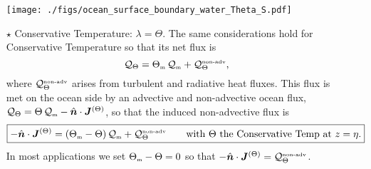 \documentclass[10pt]{beamer}
\begin{document}
\begin{frame}
\begin{itemize}
\begin{center}
{\texttt{[image: ./figs/ocean\_surface\_boundary\_water\_Theta\_S.pdf]}}
 \end{center}


\item[$\star$] {\sc Conservative Temperature}: $\lambda = \Theta$.
  The same considerations hold for Conservative Temperature so that
  its net flux is
\begin{equation*}  
\mathcal{Q}_{\Theta} = \Theta_{\mbox{\tiny m}} \,
  \mathcal{Q}_{\mbox{\tiny m}} + \mathcal{Q}_{\Theta}^{\mbox{\tiny non-adv}}, 
\end{equation*}
where $\mathcal{Q}_{\Theta}^{\mbox{\tiny non-adv}}$ arises from
turbulent and radiative heat fluxes.  This flux is met on the ocean
side by an advective and non-advective ocean flux,
$\mathcal{Q}_{\Theta} = \Theta \, \mathcal{Q}_{\mbox{\tiny m}} -
\hat{\bm n} \cdot {\bm J}^{(\Theta)}$, so that the induced
non-advective flux is
\begin{equation*}
\boxed{
  -\hat{\bm n} \cdot {\bm J}^{(\Theta)} = 
 (\Theta_{\mbox{\tiny m}} - \Theta) \, \mathcal{Q}_{\mbox{\tiny m}} + \mathcal{Q}_{\Theta}^{\mbox{\tiny non-adv}}
 \qquad \mbox{with $\Theta$ the Conservative Temp at $z=\eta$.}
}
\end{equation*}
In most applications we set $\Theta_{\mbox{\tiny m}} - \Theta =0$ so
that
$-\hat{\bm n} \cdot {\bm J}^{(\Theta)} =
\mathcal{Q}_{\Theta}^{\mbox{\tiny non-adv}}$.

\end{itemize}

\end{frame}
\end{document}
